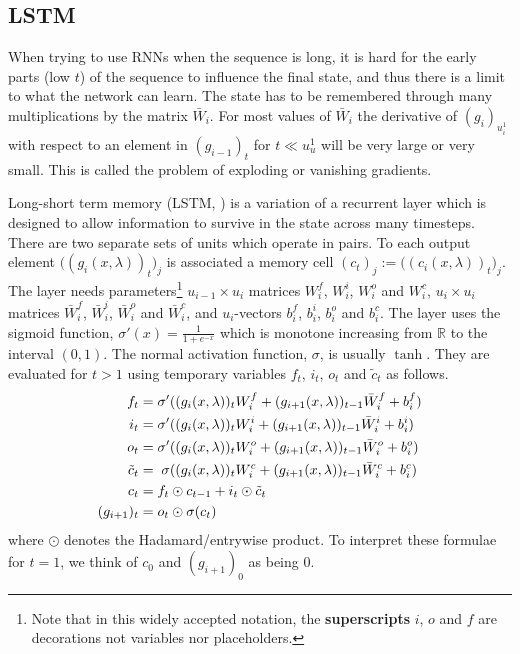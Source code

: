 \subsection{LSTM}
When trying to use RNNs when the sequence is long, it is hard for the early parts (low $t$) of the sequence to influence the final state, and thus there is a limit to what the network can learn.
The state has to be remembered through many multiplications by the matrix  $\bar W_i$.
For most values of $\bar W_i$ the derivative of $(g_i)_{u_i^1}$ with respect to an element in $(g_{i-1})_t$ for $t\ll u_u^1$ will be very large or very small.
This is called the problem of exploding or vanishing gradients.


Long-short term memory (LSTM, \cite{LSTM}) is a variation of a recurrent layer which is designed to allow information to survive in the state across many timesteps.
There are two separate sets of units which operate in pairs.
To each output element $\big((g_i(x,\lambda))_{t}\big)_j$ is associated a memory cell
$(c_t)_j:=\big((c_i(x,\lambda))_{t}\big)_j$.
The layer needs parameters\footnote{Note that in this widely accepted notation, the \textbf{superscripts} $i$, $o$ and $f$ are decorations not variables nor placeholders.}
$u_{i-1}\times u_i$ matrices $W_i^f$, $W_i^i$, $W_i^o$ and $W_i^c$, $u_{i}\times u_i$ matrices $\bar W^f_i$, $\bar W^i_i$, $\bar W^o_i$ and $\bar W^c_i$, and
$u_i$-vectors $b_i^f$, $b_i^i$, $b_i^o$ and $b_i^c$.
The layer uses the sigmoid function, $\sigma'(x)=\frac1{1+e^{-x}}$ which is monotone increasing from $\mathbb{R}$ to the interval $(0,1)$. The normal activation function, $\sigma$, is usually $\tanh$.
They are evaluated for $t>1$ using temporary variables $f_t$, $i_t$, $o_t$ and $\tilde c_t$ as follows.
\begin{align}
\gdef\makevar#1{#1_t&=\sigma'((g_i(x,\lambda))_tW^{#1}_i+(g_{i+1}(x,\lambda))_{t-1}\bar W^{#1}_i+b_i^{#1})}  \makevar{f}\\
  \makevar{i}\\
  \makevar{o} \\
  \tilde c_t  &=\phantom{\sigma'}\mathllap{\sigma}((g_i(x,\lambda))_tW^{c}_i+(g_{i+1}(x,\lambda))_{t-1}\bar W^{c}_i+b_i^{c})\\
  c_t&=f_t\odot c_{t-1}+i_t\odot\tilde c_t\label{eq:forget}\\
  (g_{i+1})_t&=o_t\odot \sigma(c_t)\label{eq:output}
\end{align}
where $\odot$ denotes the Hadamard/entrywise product. To interpret these formulae for $t=1$, we think of $c_0$ and $(g_{i+1})_0$ as being 0.

